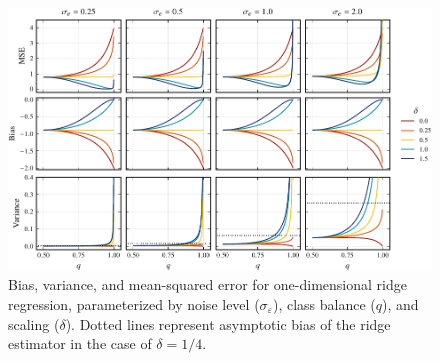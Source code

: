 \begin{figure}[htpb]
  \centering
  \includegraphics[]{plots/binary_onedim_bias_var_ridge.pdf}
  \caption{%
    Bias, variance, and mean-squared error for one-dimensional ridge regression,
    parameterized by noise level (\(\sigma_\varepsilon\)), class balance (\(q\)), and
    scaling (\(\delta\)). Dotted lines represent asymptotic bias of the ridge
    estimator in the case of \(\delta = 1/4\).}
  \label{fig:bias-var-onedim-ridge-full}
\end{figure}

